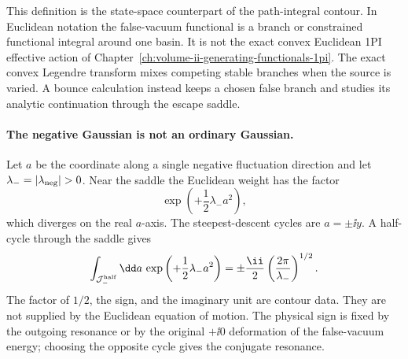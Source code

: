 This definition is the state-space counterpart of the path-integral contour.
In Euclidean notation the false-vacuum functional is a branch or constrained
functional integral around one basin.  It is not the exact convex Euclidean
1PI effective action of
Chapter~\ref{ch:volume-ii-generating-functionals-1pi}.  The exact convex
Legendre transform mixes competing stable branches when the source is varied.
A bounce calculation instead keeps a chosen false branch and studies its
analytic continuation through the escape saddle.

\paragraph{The negative Gaussian is not an ordinary Gaussian.}
Let \(a\) be the coordinate along a single negative fluctuation direction and
let \(\lambda_-=|\lambda_{\rm neg}|>0\).  Near the saddle the Euclidean weight
has the factor
\[
  \exp\left(+\frac12\lambda_- a^2\right),
\]
which diverges on the real \(a\)-axis.  The steepest-descent cycles are
\(a=\pm \ii y\).  A half-cycle through the saddle gives
\begin{equation}
  \int_{\mathcal J_-^{\rm half}}\dd a\,
  \exp\left(+\frac12\lambda_-a^2\right)
  =
  \pm\frac{\ii}{2}
  \left(\frac{2\pi}{\lambda_-}\right)^{1/2}.
  \label{eq:false-vacuum-negative-mode-half-gaussian}
\end{equation}
The factor of \(1/2\), the sign, and the imaginary unit are contour data.
They are not supplied by the Euclidean equation of motion.  The physical sign
is fixed by the outgoing resonance or by the original \(+\ii0\) deformation of
the false-vacuum energy; choosing the opposite cycle gives the conjugate
resonance.

